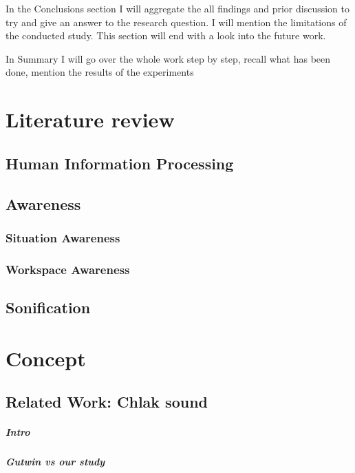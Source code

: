 In the Conclusions section I will aggregate the all findings and prior discussion to try and give an answer to the research question. I will mention the limitations of the conducted study. This section will end with a look into the future work. 

In Summary I will go over the whole work step by step, recall what has been done, mention the results of the experiments

\chapter{Literature review}
\section{Human Information Processing}
\section{Awareness}
\subsection{Situation Awareness}
\subsection{Workspace Awareness}
\section{Sonification}
\chapter{Concept}
\section{Related Work: Chlak sound}
\paragraph{Intro}
\paragraph{Gutwin vs our study}

